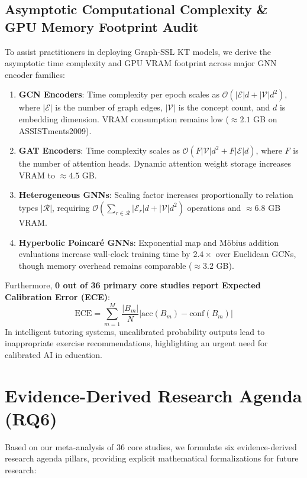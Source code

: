 \documentclass[10pt,journal,compsoc]{IEEEtran}
\begin{document}
\subsection{Asymptotic Computational Complexity \& GPU Memory Footprint Audit}
To assist practitioners in deploying Graph-SSL KT models, we derive the asymptotic time complexity and GPU VRAM footprint across major GNN encoder families:
\begin{enumerate}
    \item \textbf{GCN Encoders}: Time complexity per epoch scales as $\mathcal{O}(|\mathcal{E}| d + |\mathcal{V}| d^2)$, where $|\mathcal{E}|$ is the number of graph edges, $|\mathcal{V}|$ is the concept count, and $d$ is embedding dimension. VRAM consumption remains low ($\approx 2.1$ GB on ASSISTments2009).
    \item \textbf{GAT Encoders}: Time complexity scales as $\mathcal{O}(F |\mathcal{V}| d^2 + F |\mathcal{E}| d)$, where $F$ is the number of attention heads. Dynamic attention weight storage increases VRAM to $\approx 4.5$ GB.
    \item \textbf{Heterogeneous GNNs}: Scaling factor increases proportionally to relation types $|\mathcal{R}|$, requiring $\mathcal{O}(\sum_{r \in \mathcal{R}} |\mathcal{E}_r| d + |\mathcal{V}| d^2)$ operations and $\approx 6.8$ GB VRAM.
    \item \textbf{Hyperbolic Poincaré GNNs}: Exponential map and Möbius addition evaluations increase wall-clock training time by $2.4\times$ over Euclidean GCNs, though memory overhead remains comparable ($\approx 3.2$ GB).
\end{enumerate}

Furthermore, \textbf{0 out of 36 primary core studies report Expected Calibration Error (ECE)}:
\begin{equation}
\text{ECE} = \sum_{m=1}^{M} \frac{|B_m|}{N} \left| \text{acc}(B_m) - \text{conf}(B_m) \right|
\end{equation}
In intelligent tutoring systems, uncalibrated probability outputs lead to inappropriate exercise recommendations, highlighting an urgent need for calibrated AI in education.

\section{Evidence-Derived Research Agenda (RQ6)}

Based on our meta-analysis of 36 core studies, we formulate six evidence-derived research agenda pillars, providing explicit mathematical formalizations for future research:
\end{document}
